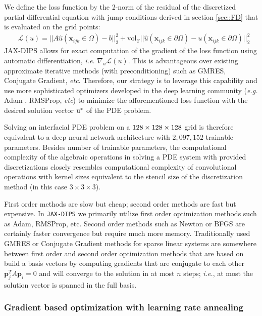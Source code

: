 \documentclass{elsarticle}
\begin{document}
We define the loss function by the 2-norm of the residual of the discretized partial differential equation with jump conditions derived in section \ref{sec::FD} that is evaluated on the grid points:
\begin{align*}
	&\mathcal{L}(u) = \vert\vert A\hat{u}(\mathbf{x}_{ijk}\in \Omega) - b\vert\vert_2^2 + \textrm{vol}_{\mathcal{C}}\vert\vert \hat{u}(\mathbf{x}_{ijk}\in\partial \Omega) - u(\mathbf{x}_{ijk}\in\partial \Omega)\vert\vert_2^2 
\end{align*}
JAX-DIPS allows for exact computation of the gradient of the loss function using automatic differentiation, \textit{i.e.} $\nabla_u \mathcal{L}(u)$. This is advantageous over existing approximate iterative methods (with preconditioning) such as GMRES, Conjugate Gradient, \textit{etc}. Therefore, our strategy is to leverage this capability and use more sophisticated optimizers developed in the deep learning community (\textit{e.g.} Adam \cite{kingma2014adam}, RMSProp, \textit{etc}) to minimize the afforementioned loss function with the desired solution vector $\rm u^\ast$ of the PDE problem.

Solving an interfacial PDE problem on a $\rm 128\times 128 \times 128$ grid is therefore equivalent to a deep neural network architecture with $2,097,152$ trainable parameters. Besides number of trainable parameters, the computational complexity of the algebraic operations in solving a PDE system with provided discretizations closely resembles computational complexity of convolutional operations with kernel sizes equivalent to the stencil size of the discretization method (in this case $3\times 3 \times 3$).


First order methods are slow but cheap; second order methods are fast but expensive. In \texttt{JAX-DIPS} we primarily utilize first order optimization methods such as Adam, RMSProp, etc. Second order methods such as Newton or BFGS are certainly faster convergence but require much more memory. Traditionally used GMRES or Conjugate Gradient methods for sparse linear systems are somewhere between first order and second order optimization methods that are based on build a basis vectors by computing gradients that are conjugate to each other $\mathbf{p}_j^T A \mathbf{p}_i=0$ and will converge to the solution in at most $n$ steps; \textit{i.e.}, at most the solution vector is spanned in the full basis.


\subsubsection{Gradient based optimization with learning rate annealing}
\end{document}
